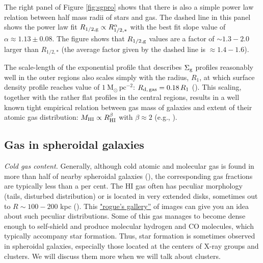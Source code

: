 The right panel of Figure \ref{fig:sgpro} shows that there is also a simple power law relation between half mass radii of stars and gas. The dashed line in this panel shows the power law fit $R_{1/2,\rm g}\propto R_{1/2,*}^{\alpha}$ with the best fit slope value of $\alpha\approx 1.13\pm 0.08$. The figure shows that $R_{1/2,\rm g}$ values are a factor of $\sim 1.3-2.0$ larger than $R_{1/2,*}$ (the average factor given by the dashed line is $\approx 1.4-1.6$).

The scale-length of the exponential profile that describes $\Sigma_{\rm g}$ profiles reasonably well in the outer regions also scales simply with the radius, $R_1$, at which surface density profile reaches value of $1\ \mathrm{M_{\odot}\,pc^{-2}}$: $R_{\rm d,\, gas}=0.18\, R_1$ (\href{http://adsabs.harvard.edu/abs/2014MNRAS.441.2159W}{\citealt{wang_etal14}}). This scaling, together with the rather flat profiles in the central regions, results in a well known tight empirical relation between gas mass of galaxies and extent of their atomic gas 
distribution: $M_{\rm HI}\propto R_{\rm HI}^\beta$ with $\beta\approx 2$ (e.g., \href{http://adsabs.harvard.edu/abs/1997A%26A...324..877B}{\citealt{broeils_rhee97}}). 
 
\subsection{Gas in spheroidal galaxies}

{\it Cold gas content.} Generally, although cold atomic and molecular gas is found in more than half of nearby spheroidal galaxies (\href{http://adsabs.harvard.edu/abs/2006MNRAS.371..157M}{\citealt{morganti_etal06}}), the corresponding gas fractions are typically less than a per cent. The HI gas often has peculiar morphology (tails, disturbed distribution) or is located in very extended disks, sometimes out to $R\sim 100-200$ kpc (\href{http://adsabs.harvard.edu/abs/2007A%26A...465..787O}{\citealt{oosterloo_etal07}}). This \href{http://www.nrao.edu/astrores/HIrogues/RoguesLiving.shtml}{"\underline{rogue's gallery}''} of images can give you an idea about such peculiar distributions. Some of this gas manages to become dense enough to self-shield and produce molecular hydrogen and CO molecules, which typically accompany star formation. Thus, star formation is sometimes observed in spheroidal galaxies, especially those located at the centers of X-ray groups and clusters. We will discuss them more when we will talk about clusters. 

